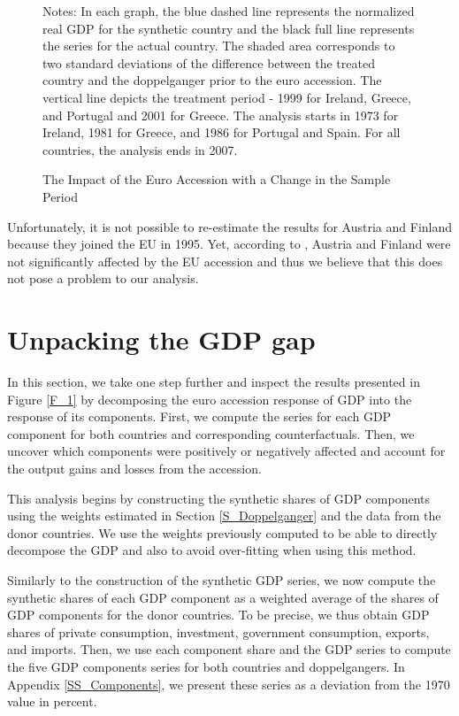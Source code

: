 \documentclass[12pt]{article}
\newcommand{\annote}[1]{\parbox{\textwidth}{\renewcommand{\baselinestretch}{1.0}\vspace{12pt} \small Notes: #1}}
\begin{document}
\begin{figure}[h!]
	\centering
	\caption{The Impact of the Euro Accession with a Change in the Sample Period}	
	\label{F_Start}
    \vspace{-1em}
	\annote{In each graph, the blue dashed line represents the normalized real GDP for the synthetic country and the black full line represents the series for the actual country. The shaded area corresponds to two standard deviations of the difference between the treated country and the doppelganger prior to the euro accession. The vertical line depicts the treatment period - 1999 for Ireland, Greece, and Portugal and 2001 for Greece. The analysis starts in 1973 for Ireland, 1981 for Greece, and 1986 for Portugal and Spain. For all countries, the analysis ends in 2007.
    }
\end{figure}

Unfortunately, it is not possible to re-estimate the results for Austria and Finland because they joined the EU in 1995. Yet, according to \cite{Campos2018}, Austria and Finland were not significantly affected by the EU accession and thus we believe that this does not pose a problem to our analysis.


\section{Unpacking the GDP gap \label{S_Components}}

In this section, we take one step further and inspect the results presented in Figure \ref{F_1} by decomposing the euro accession response of GDP into the response of its components. First, we compute the series for each GDP component for both countries and corresponding counterfactuals. Then, we uncover which components were positively or negatively affected and account for the output gains and losses from the accession. 

This analysis begins by constructing the synthetic shares of GDP components using the weights estimated in Section \ref{S_Doppelganger} and the data from the donor countries. We use the weights previously computed to be able to directly decompose the GDP and also to avoid over-fitting when using this method.

Similarly to the construction of the synthetic GDP series, we now compute the synthetic shares of each GDP component as a weighted average of the shares of GDP components for the donor countries. To be precise, we thus obtain GDP shares of private consumption, investment, government consumption, exports, and imports. Then, we use each component share and the GDP series to compute the five GDP components series for both countries and doppelgangers. In Appendix \ref{SS_Components}, we present these series as a deviation from the 1970 value in percent.
\end{document}
